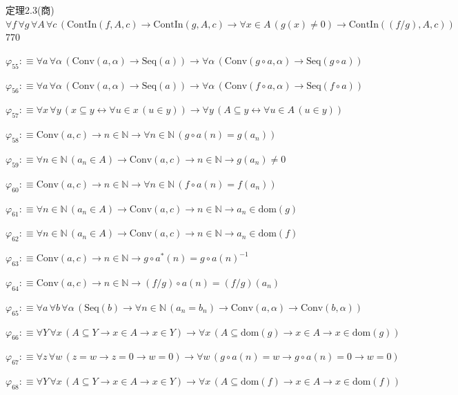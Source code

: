 \begin{fullproof}{定理2.3(商)}{$\forall f\,\forall g\,\forall A\,\forall c\,(\mathrm{ContIn}(f,A,c) \to \mathrm{ContIn}(g,A,c) \to \forall x \in A\,(g(x) \neq 0) \to \mathrm{ContIn}((f / g),A,c))$}{770}
\begin{abbrevlist}
\item $\varphi_{55} :\equiv \forall a\,\forall \alpha\,(\mathrm{Conv}(a,\alpha) \to \mathrm{Seq}(a)) \to \forall \alpha\,(\mathrm{Conv}(g \circ a,\alpha) \to \mathrm{Seq}(g \circ a))$
\item $\varphi_{56} :\equiv \forall a\,\forall \alpha\,(\mathrm{Conv}(a,\alpha) \to \mathrm{Seq}(a)) \to \forall \alpha\,(\mathrm{Conv}(f \circ a,\alpha) \to \mathrm{Seq}(f \circ a))$
\item $\varphi_{57} :\equiv \forall x\,\forall y\,(x \subseteq y \leftrightarrow \forall u \in x\,(u \in y)) \to \forall y\,(A \subseteq y \leftrightarrow \forall u \in A\,(u \in y))$
\item $\varphi_{58} :\equiv \mathrm{Conv}(a,c) \to n \in \mathbb{N} \to \forall n \in \mathbb{N}\,(g \circ a(n) = g(a_{n}))$
\item $\varphi_{59} :\equiv \forall n \in \mathbb{N}\,(a_{n} \in A) \to \mathrm{Conv}(a,c) \to n \in \mathbb{N} \to g(a_{n}) \neq 0$
\item $\varphi_{60} :\equiv \mathrm{Conv}(a,c) \to n \in \mathbb{N} \to \forall n \in \mathbb{N}\,(f \circ a(n) = f(a_{n}))$
\item $\varphi_{61} :\equiv \forall n \in \mathbb{N}\,(a_{n} \in A) \to \mathrm{Conv}(a,c) \to n \in \mathbb{N} \to a_{n} \in \mathrm{dom}(g)$
\item $\varphi_{62} :\equiv \forall n \in \mathbb{N}\,(a_{n} \in A) \to \mathrm{Conv}(a,c) \to n \in \mathbb{N} \to a_{n} \in \mathrm{dom}(f)$
\item $\varphi_{63} :\equiv \mathrm{Conv}(a,c) \to n \in \mathbb{N} \to g \circ a^{\ast}(n) = g \circ a(n)^{-1}$
\item $\varphi_{64} :\equiv \mathrm{Conv}(a,c) \to n \in \mathbb{N} \to (f / g) \circ a(n) = (f / g)(a_{n})$
\item $\varphi_{65} :\equiv \forall a\,\forall b\,\forall \alpha\,(\mathrm{Seq}(b) \to \forall n \in \mathbb{N}\,(a_{n} = b_{n}) \to \mathrm{Conv}(a,\alpha) \to \mathrm{Conv}(b,\alpha))$
\item $\varphi_{66} :\equiv \forall Y\,\forall x\,(A \subseteq Y \to x \in A \to x \in Y) \to \forall x\,(A \subseteq \mathrm{dom}(g) \to x \in A \to x \in \mathrm{dom}(g))$
\item $\varphi_{67} :\equiv \forall z\,\forall w\,(z = w \to z = 0 \to w = 0) \to \forall w\,(g \circ a(n) = w \to g \circ a(n) = 0 \to w = 0)$
\item $\varphi_{68} :\equiv \forall Y\,\forall x\,(A \subseteq Y \to x \in A \to x \in Y) \to \forall x\,(A \subseteq \mathrm{dom}(f) \to x \in A \to x \in \mathrm{dom}(f))$

\end{abbrevlist}
\end{fullproof}
